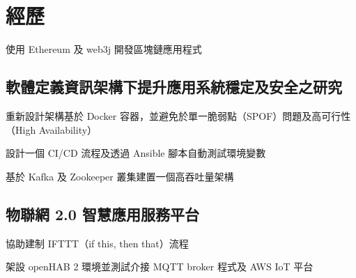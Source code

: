 \documentclass[]{deedy-resume-openfont-ch}
\begin{document}
%
%
\lastupdated

%
%

%
%

\begin{minipage}[t]{0.45\textwidth}



\section{經歷}

\vspace{\topsep} %
\begin{tightemize}
    \item 使用 Ethereum 及 web3j 開發區塊鏈應用程式
\end{tightemize}
\sectionsep

\subsection{軟體定義資訊架構下提升應用系統穩定及安全之研究}
\begin{tightemize}
    \item 重新設計架構基於 Docker 容器，並避免於單一脆弱點（SPOF）問題及高可行性（High Availability）
    \item 設計一個 CI/CD 流程及透過 Ansible 腳本自動測試環境變數
    \item 基於 Kafka 及 Zookeeper 叢集建置一個高吞吐量架構
\end{tightemize}

\subsection{物聯網 2.0 智慧應用服務平台}
\begin{tightemize}
    \item 協助建制 IFTTT（if this, then that）流程
    \item 架設 openHAB 2 環境並測試介接 MQTT broker 程式及 AWS IoT 平台
\end{tightemize}


\end{minipage}
\end{document}
